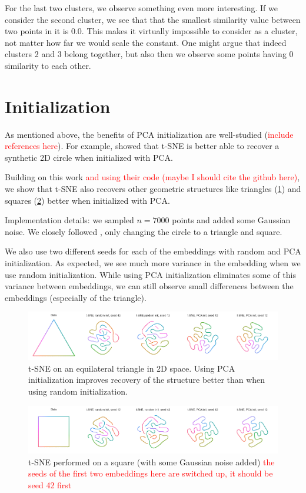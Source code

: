 For the last two clusters, we observe something even more interesting. 
If we consider the second cluster, we see that that the smallest similarity value between two points in it is $0.0$. 
This makes it virtually impossible to consider as a cluster, not matter how far we would scale the constant. 
One might argue that indeed clusters 2 and 3 belong together, but also then we observe some points having $0$ similarity to each other. 

\section{Initialization}
As mentioned above, the benefits of PCA initialization are well-studied (\textcolor{red}{include references here}). 
For example, \cite{kobak21} showed that t-SNE is better able to recover a synthetic 2D circle when initialized with PCA. 

Building on this work \textcolor{red}{and using their code (maybe I should cite the github here)}, we show that t-SNE also recovers other geometric structures like triangles (\ref{fig:triangle}) and squares (\ref{fig:square}) better when initialized with PCA. 

Implementation details: we sampled $n=7000$ points and added some Gaussian noise. We closely followed \cite{kobak21}, only changing the circle to a triangle and square. 

We also use two different seeds for each of the embeddings with random and PCA initialization. 
As expected, we see much more variance in the embedding when we use random initialization. While using PCA initialization eliminates some of this variance between embeddings, we can still observe small differences between the embeddings (especially of the triangle). 

\begin{figure}[h]
    \centering 
        \includegraphics[width=\linewidth]{figures/t_sne_on_triangle.png}
        \caption{t-SNE on an equilateral triangle in 2D space. Using PCA initialization improves recovery of the structure better than when using random initialization.}
    \label{fig:triangle}
\end{figure}

\begin{figure}[h]
    \centering 
        \includegraphics[width=\linewidth]{figures/t_sne_on_square.png}
        \caption{t-SNE performed on a square (with some Gaussian noise added) \textcolor{red}{the seeds of the first two embeddings here are switched up, it should be seed 42 first}}
    \label{fig:square}
\end{figure}

